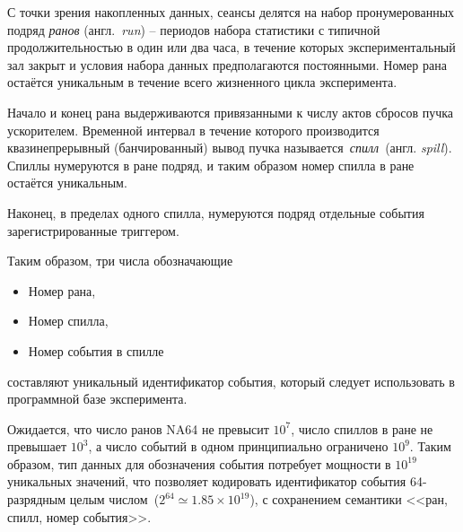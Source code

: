 С точки зрения накопленных данных, сеансы делятся на набор
пронумерованных подряд \emph{ранов} (англ.~\emph{run}) --
периодов набора статистики с типичной
продолжительностью в один или два часа, в течение которых
экспериментальный зал закрыт и условия набора данных предполагаются
постоянными. Номер рана остаётся уникальным в течение всего
жизненного цикла эксперимента.

Начало и конец рана выдерживаются привязанными к числу актов
сбросов пучка ускорителем. Временной интервал в течение которого
производится квазинепрерывный (банчированный) вывод пучка
называется~\emph{спилл}~(англ. \emph{spill}). Спиллы нумеруются
в ране подряд, и таким образом номер спилла в ране остаётся
уникальным.

Наконец, в пределах одного спилла, нумеруются подряд отдельные
события зарегистрированные триггером.

Таким образом, три числа обозначающие
\begin{itemize}
    \item Номер рана,
    \item Номер спилла,
    \item Номер события в спилле
\end{itemize}
составляют уникальный идентификатор события, который следует
использовать в программной базе эксперимента.

Ожидается, что число ранов NA64 не превысит $10^7$, число
спиллов в ране не превышает $10^3$, а число событий в одном
принципиально ограничено $10^9$. Таким образом, тип данных
для обозначения события потребует мощности в $10^19$ уникальных
значений, что позволяет кодировать идентификатор события
64-разрядным целым числом~($2^{64} \simeq1.85\times10^{19}$),
с сохранением семантики <<ран, спилл, номер события>>.
